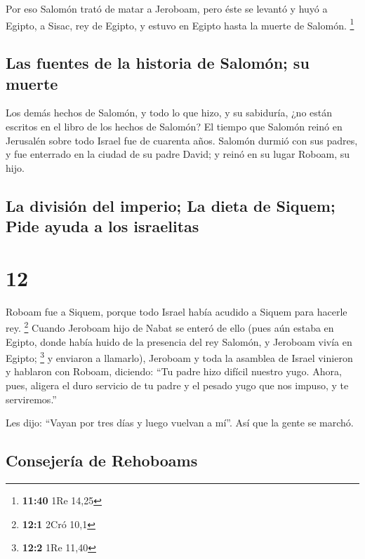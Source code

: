  Por eso Salomón trató de matar a Jeroboam, pero éste se
levantó y huyó a Egipto, a Sisac, rey de Egipto, y estuvo en Egipto
hasta la muerte de Salomón. \footnote{\textbf{11:40} 1Re 14,25}

\hypertarget{las-fuentes-de-la-historia-de-salomuxf3n-su-muerte}{%
\subsection{Las fuentes de la historia de Salomón; su
muerte}\label{las-fuentes-de-la-historia-de-salomuxf3n-su-muerte}}

 Los demás hechos de Salomón, y todo lo que hizo, y su
sabiduría, ¿no están escritos en el libro de los hechos de Salomón?
 El tiempo que Salomón reinó en Jerusalén sobre todo
Israel fue de cuarenta años.  Salomón durmió con sus
padres, y fue enterrado en la ciudad de su padre David; y reinó en su
lugar Roboam, su hijo.

\hypertarget{la-divisiuxf3n-del-imperio-la-dieta-de-siquem-pide-ayuda-a-los-israelitas}{%
\subsection{La división del imperio; La dieta de Siquem; Pide ayuda a
los
israelitas}\label{la-divisiuxf3n-del-imperio-la-dieta-de-siquem-pide-ayuda-a-los-israelitas}}

\hypertarget{section-11}{%
\section{12}\label{section-11}}

 Roboam fue a Siquem, porque todo Israel había acudido a
Siquem para hacerle rey. \footnote{\textbf{12:1} 2Cró 10,1}
 Cuando Jeroboam hijo de Nabat se enteró de ello (pues aún
estaba en Egipto, donde había huido de la presencia del rey Salomón, y
Jeroboam vivía en Egipto; \footnote{\textbf{12:2} 1Re 11,40}
 y enviaron a llamarlo), Jeroboam y toda la asamblea de
Israel vinieron y hablaron con Roboam, diciendo:  ``Tu
padre hizo difícil nuestro yugo. Ahora, pues, aligera el duro servicio
de tu padre y el pesado yugo que nos impuso, y te serviremos.''

 Les dijo: ``Vayan por tres días y luego vuelvan a mí''.
Así que la gente se marchó.

\hypertarget{consejeruxeda-de-rehoboams}{%
\subsection{Consejería de Rehoboams}\label{consejeruxeda-de-rehoboams}}

